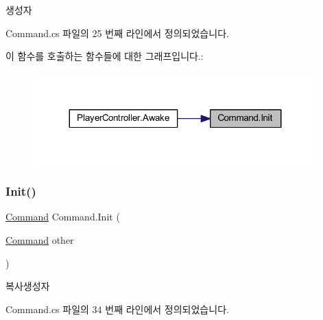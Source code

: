 생성자 



Command.\+cs 파일의 25 번째 라인에서 정의되었습니다.


\begin{DoxyCode}{0}

\end{DoxyCode}
이 함수를 호출하는 함수들에 대한 그래프입니다.\+:
\nopagebreak
\begin{figure}[H]
\begin{center}
\leavevmode
\includegraphics[width=311pt]{d5/d6a/class_command_afc8d0350d5935d74a3685f427173d62e_icgraph}
\end{center}
\end{figure}
\mbox{\label{class_command_a4f0000c27196a2cb5f5c3a38ce0ff952}} 
\subsubsection{\texorpdfstring{Init()}{Init()}\hspace{0.1cm}{\footnotesize\ttfamily [2/2]}}
{\footnotesize\ttfamily \mbox{\hyperlink{class_command}{Command}} Command.\+Init (\begin{DoxyParamCaption}\item[{\mbox{\hyperlink{class_command}{Command}}}]{other }\end{DoxyParamCaption})}



복사생성자 



Command.\+cs 파일의 34 번째 라인에서 정의되었습니다.


